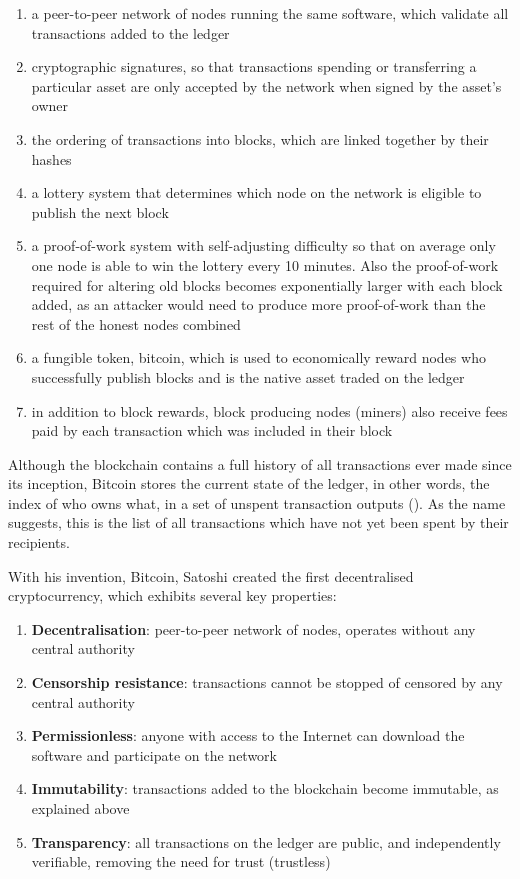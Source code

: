 \begin{enumerate}
    \item a peer-to-peer network of nodes running the same software, which validate all transactions added to the ledger 
    \item cryptographic signatures, so that transactions spending or transferring a particular asset are only accepted by the network when signed by the asset's owner
    \item the ordering of transactions into blocks, which are linked together by their hashes
    \item a lottery system that determines which node on the network is eligible to publish the next block
    \item a proof-of-work system with self-adjusting difficulty so that on average only one node is able to win the lottery every 10 minutes. Also the proof-of-work required for altering old blocks becomes exponentially larger with each block added, as an attacker would need to produce more proof-of-work than the rest of the honest nodes combined
    \item a fungible token, bitcoin, which is used to economically reward nodes who successfully publish blocks and is the native asset traded on the ledger
    \item in addition to block rewards, block producing nodes (miners) also receive fees paid by each transaction which was included in their block
\end{enumerate}

\vspace{0.5cm}

Although the blockchain contains a full history of all transactions ever made since its inception, Bitcoin stores the current state of the ledger, in other words, the index of who owns what, in a set of unspent transaction outputs (). As the name suggests, this is the list of all transactions which have not yet been spent by their recipients.

With his invention, Bitcoin, Satoshi created the first decentralised cryptocurrency, which exhibits several key properties:

\begin{enumerate}
    \item \textbf{Decentralisation}: peer-to-peer network of nodes, operates without any central authority
    \item  \textbf{Censorship resistance}: transactions cannot be stopped of censored by any central authority
    \item  \textbf{Permissionless}: anyone with access to the Internet can download the software and participate on the network
    \item  \textbf{Immutability}: transactions added to the blockchain become immutable, as explained above
    \item  \textbf{Transparency}: all transactions on the ledger are public, and independently verifiable, removing the need for trust (trustless)
\end{enumerate}

